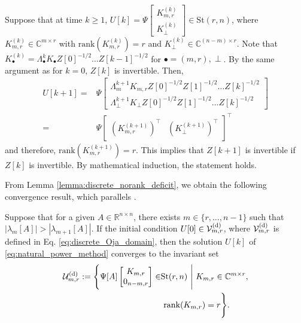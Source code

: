 \documentclass{ifacconf}
\begin{document}
\begin{pf}
Suppose that at time $k \geq 1$, $ U[ k ] =  \Psi \begin{bmatrix}
    K_{m,r}^{(k)} \\ K_{\perp}^{(k)}
    \end{bmatrix}
    \in \mathrm{St}(r,n)$, 
where $K_{m,r}^{(k)} \in \mathbb{C}^{m\times r}$ with $\mathrm{rank}(K_{m,r}^{(k)} ) =r $ and $K_{\perp}^{(k)} \in \mathbb{C}^{(n-m) \times r}$.  
Note that $K_{\bullet } ^{(k)} = \Lambda _{\bullet} ^{k} K_{\bullet} Z[0]^{-1/2}\dots Z[ k -1] ^{-1/2}$ for $\bullet = (m,r),\perp$. 
By the same argument as for $k=0$, $Z[k]$ is invertible. Then,
\begin{align*}
    U[k +1 ] = & \Psi \begin{bmatrix}
    \Lambda _{m}^{ k +1} K_{m,r} Z[0]^{-1/2} Z[1]^{-1/2} \dots Z[ k ] ^{-1/2}
    \\ 
    \Lambda _{\perp} ^{ k +1}K_{\perp}Z[0]^{-1/2} Z[1]^{-1/2} \dots Z[ k ] ^{-1/2}
    \end{bmatrix}
    \\
    =&
    \Psi \begin{bmatrix}
    (K_{m,r}^{( k +1)}) ^{\top}
    & 
    (K_{\perp}^{( k +1)}) ^{\top}
    \end{bmatrix}^{\top}
\end{align*}
and therefore, $\mathrm{rank}(K_{m,r}^{(k +1)}) =r$. 
This implies that $Z[k+1]$ is invertible if $Z[k]$ is invertible.  
By mathematical induction, the statement holds.
\end{pf}

From Lemma \ref{lemma:discrete_norank_deficit}, we obtain the following convergence result, which parallels \cite{TsuzukiOhki2025global}.

\begin{thm}\label{thm:discrete_eigenvector_subspace}
Suppose that for a given $A\in \mathbb{R}^{n\times n}$, there exists $m \in \{r, \dots ,n-1\}$ such that $| \lambda _{m} [A] | > | \lambda _{m+1} [A] | $. 
If the initial condition $U[0] \in \mathcal{V}_{m,r}^{\rm (d)}$, where $\mathcal{V}_{m,r}^{\rm (d)}$ is defined in Eq. \eqref{eq:discrete_Oja_domain}, then the solution $U[k]$ of \eqref{eq:natural_power_method} converges to the invariant set
\begin{align}
    \mathcal{U}_{m,r}^{\rm (d)} := \Bigg{\{} \Psi [A] \begin{bmatrix} K_{m,r} \\ 0_{n-m,r} \end{bmatrix}  \in & \mathrm{St}(r,n)  \ \Bigg{|}  \ K_{m,r} \in \mathbb{C}^{m\times r},
    \nonumber \\ &
    \ \mathrm{rank}(K_{m,r}) =r \Bigg{\}}.
    \label{eq:discrete_equillibriums}
\end{align}
\end{thm}
\end{document}
